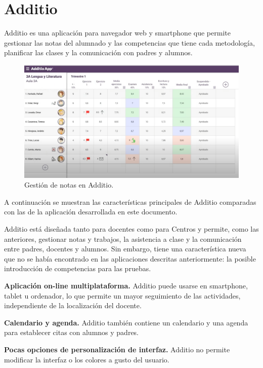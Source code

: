 \section{Additio}
\label{sec:additio}

Additio es una aplicación para navegador web y smartphone\cite{additio} que permite gestionar las notas del alumnado y las competencias que tiene cada metodología, planificar las clases y la comunicación con padres y alumnos.

\begin{figure}[h]
\centering\includegraphics[width=1\linewidth]{figs/additio.png}
\caption{Gestión de notas en Additio.\cite{additioyoutube}}
\label{Fig:additio}
\end{figure}

A continuación se muestran las características principales de Additio comparadas con las de la aplicación desarrollada en este documento.

Additio está diseñada tanto para docentes como para Centros y permite, como las anteriores, gestionar notas y trabajos, la asistencia a clase y la comunicación entre padres, docentes y alumnos. Sin embargo, tiene una característica nueva que no se había encontrado en las aplicaciones descritas anteriormente: la posible introducción de competencias para las pruebas.

\textbf {Aplicación on-line multiplataforma.} Additio puede usarse en smartphone, tablet u ordenador, lo que permite un mayor seguimiento de las actividades, independiente de la localización del docente.
 
\textbf {Calendario y agenda.} Additio también contiene un calendario y una agenda para establecer citas con alumnos y padres.

\textbf {Pocas opciones de personalización de interfaz.} Additio no permite modificar la interfaz o los colores a gusto del usuario.


